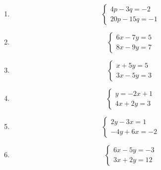 \documentclass[12pt,letterpaper]{report}
\begin{document}
\begin{enumerate}
\begin{equation*}
\begin{matrix}
             2x+y=9\\
             8x+4y=36
        \end{matrix} \right.
    \end{equation*}
    \item\begin{equation*}
        \left\lbrace \begin{matrix}
             4p-3q=-2\\
             20p-15q=-1
        \end{matrix} \right.
    \end{equation*}
    \item\begin{equation*}
        \left\lbrace \begin{matrix}
             6x-7y=5\\
             8x-9y=7
        \end{matrix} \right.
    \end{equation*}
    \item\begin{equation*}
        \left\lbrace \begin{matrix}
             x+5y=5\\
             3x-5y=3
        \end{matrix} \right.
    \end{equation*}
    \item\begin{equation*}
        \left\lbrace \begin{matrix}
             y=-2x+1\\
             4x+2y=3
        \end{matrix} \right.
    \end{equation*}
    \item\begin{equation*}
        \left\lbrace \begin{matrix}
             2y-3x=1\\
             -4y+6x=-2
        \end{matrix} \right.
    \end{equation*}
    \item\begin{equation*}
        \left\lbrace \begin{matrix}
             6x-5y=-3\\
             3x+2y=12
        \end{matrix} \right.
    \end{equation*}
\end{enumerate}
\end{document}

